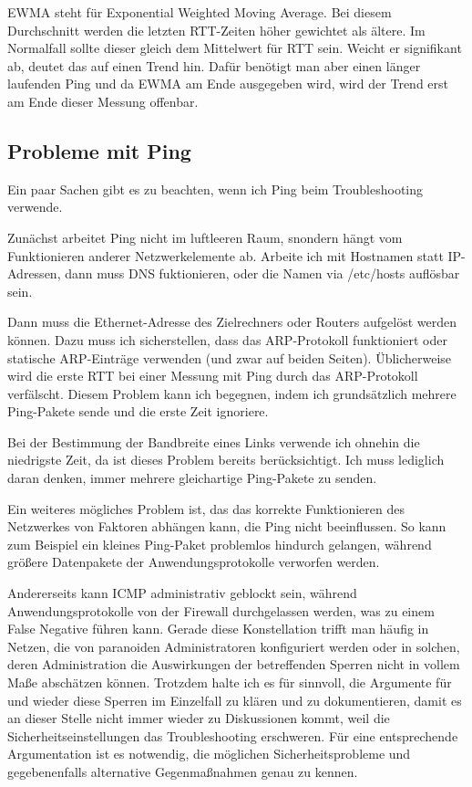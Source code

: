\begin{normaltext}
  EWMA steht für Exponential Weighted Moving Average. Bei diesem Durchschnitt
  werden die letzten  RTT-Zeiten höher gewichtet als ältere. Im Normalfall
  sollte dieser gleich dem Mittelwert für RTT sein. Weicht er signifikant ab,
  deutet das auf einen Trend hin. Dafür benötigt man aber einen länger
  laufenden Ping und da EWMA am Ende ausgegeben wird, wird der Trend erst am
  Ende dieser Messung offenbar.

  \subsection{Probleme mit Ping}
  Ein paar Sachen gibt es zu beachten, wenn ich Ping beim Troubleshooting
  verwende.

  Zunächst arbeitet Ping nicht im luftleeren Raum, snondern hängt vom
  Funktionieren anderer Netzwerkelemente ab. Arbeite ich mit Hostnamen statt
  IP-Adressen, dann muss DNS fuktionieren, oder die Namen via /etc/hosts
  auflösbar sein.

  Dann muss die Ethernet-Adresse des Zielrechners oder Routers aufgelöst
  werden können. Dazu muss ich sicherstellen, dass das ARP-Protokoll
  funktioniert oder statische ARP-Einträge verwenden (und zwar auf beiden
  Seiten). Üblicherweise wird die erste RTT bei einer Messung mit Ping durch
  das ARP-Protokoll verfälscht. Diesem Problem kann ich begegnen, indem ich
  grundsätzlich mehrere Ping-Pakete sende und die erste Zeit ignoriere.

  Bei der Bestimmung der Bandbreite eines Links verwende ich ohnehin die
  niedrigste Zeit, da ist dieses Problem bereits berücksichtigt. Ich muss
  lediglich daran denken, immer mehrere gleichartige Ping-Pakete zu senden.

  Ein weiteres mögliches Problem ist, das das korrekte Funktionieren des
  Netzwerkes von Faktoren abhängen kann, die Ping nicht beeinflussen. So kann
  zum Beispiel ein kleines Ping-Paket problemlos hindurch gelangen, während
  größere Datenpakete der Anwendungsprotokolle verworfen werden.

  Andererseits kann ICMP administrativ geblockt sein, während
  Anwendungsprotokolle von der Firewall durchgelassen werden, was zu einem
  False Negative führen kann. Gerade diese Konstellation trifft man häufig in
  Netzen, die von paranoiden Administratoren konfiguriert werden oder in
  solchen, deren Administration die Auswirkungen der betreffenden Sperren
  nicht in vollem Maße abschätzen können. Trotzdem halte ich es für sinnvoll,
  die Argumente für und wieder diese Sperren im Einzelfall zu klären und zu
  dokumentieren, damit es an dieser Stelle nicht immer wieder zu Diskussionen
  kommt, weil die Sicherheitseinstellungen das Troubleshooting erschweren. Für
  eine entsprechende Argumentation ist es notwendig, die möglichen
  Sicherheitsprobleme und gegebenenfalls alternative Gegenmaßnahmen genau zu
  kennen.


\end{normaltext}
